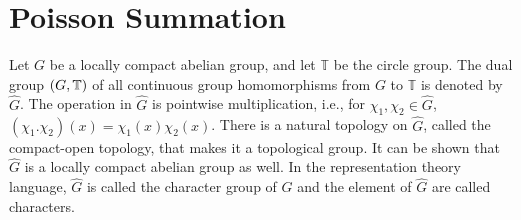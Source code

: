 \documentclass[11pt]{article}
\theoremstyle{plain}
\theoremstyle{definition}
\let\hom\relax
\DeclareMathOperator{\hom}{Hom}
\begin{document}
\section{Poisson Summation}
Let $G$ be a locally compact abelian group, and let $\mathbb{T}$ be the circle group. The dual group $\hom(G, \mathbb{T})$ of all continuous group homomorphisms from $G$ to $\mathbb{T}$ is denoted by $\widehat{G}$. The operation in $\widehat{G}$ is pointwise multiplication, i.e., for $\chi_1, \chi_2 \in \widehat{G}$, $(\chi_1 . \chi_2)(x) = \chi_1(x)\chi_2(x)$. There is a natural topology on $\widehat{G}$, called the compact-open topology, that makes it a topological group. It can be shown that $\widehat{G}$ is a locally compact abelian group as well. In the representation theory language, $\widehat{G}$ is called the character group of $G$ and the element of $\widehat{G}$ are called characters. 
\end{document}
